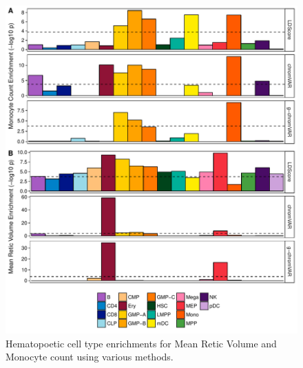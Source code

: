 \documentclass{article}\usepackage[]{graphicx}\usepackage[]{color}
\makeatletter
\def\maxwidth{ %
  \ifdim\Gin@nat@width>\linewidth
    \linewidth
  \else
    \Gin@nat@width
  \fi
}
\newenvironment{knitrout}{}{} %
\makeatother
\begin{document}
\begin{enumerate}[label=(\Alph*)]
\begin{knitrout}
\color{fgcolor}\begin{figure}[H]

{\centering \includegraphics[width=\maxwidth]{figure/barplots-1} 

}

\caption[Hematopoetic cell type enrichments for Mean Retic Volume and Monocyte count using various methods]{Hematopoetic cell type enrichments for Mean Retic Volume and Monocyte count using various methods.}\label{fig:barplots}
\end{figure}


\end{knitrout}


\begin{knitrout}
\color{fgcolor}\begin{figure}[H]


\end{figure}
\end{knitrout}
\end{enumerate}
\end{document}
